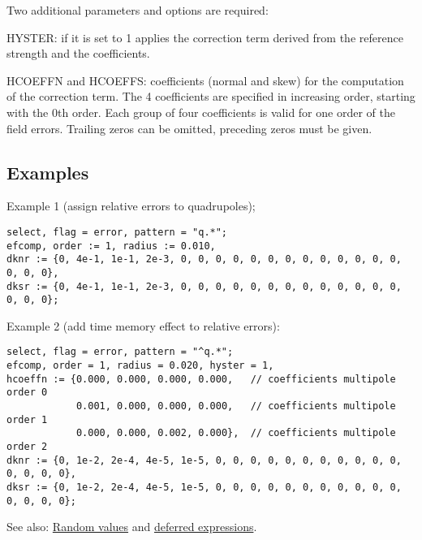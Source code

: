 Two additional parameters and options are required: 

HYSTER: if it is set to 1 applies the correction term derived from the
reference strength and the coefficients.  

HCOEFFN and HCOEFFS: coefficients (normal and skew) for the computation
of the correction term. The 4 coefficients are specified in increasing
order, starting with the 0th order. Each group of four coefficients is
valid for one order of the field errors. Trailing zeros can be omitted,
preceding zeros must be given.  

\subsection{Examples} 

Example 1 (assign relative errors to quadrupoles); 
\begin{verbatim}
select, flag = error, pattern = "q.*";
efcomp, order := 1, radius := 0.010,
dknr := {0, 4e-1, 1e-1, 2e-3, 0, 0, 0, 0, 0, 0, 0, 0, 0, 0, 0, 0, 0, 0, 0, 0},
dksr := {0, 4e-1, 1e-1, 2e-3, 0, 0, 0, 0, 0, 0, 0, 0, 0, 0, 0, 0, 0, 0, 0, 0};
\end{verbatim}

Example 2 (add time memory effect to relative errors): 
\begin{verbatim}
select, flag = error, pattern = "^q.*";
efcomp, order = 1, radius = 0.020, hyster = 1,
hcoeffn := {0.000, 0.000, 0.000, 0.000,   // coefficients multipole order 0
            0.001, 0.000, 0.000, 0.000,   // coefficients multipole order 1
            0.000, 0.000, 0.002, 0.000},  // coefficients multipole order 2
dknr := {0, 1e-2, 2e-4, 4e-5, 1e-5, 0, 0, 0, 0, 0, 0, 0, 0, 0, 0, 0, 0, 0, 0, 0},
dksr := {0, 1e-2, 2e-4, 4e-5, 1e-5, 0, 0, 0, 0, 0, 0, 0, 0, 0, 0, 0, 0, 0, 0, 0};
\end{verbatim}

See also: \href{../Introduction/expression.html#random}{Random values}
and \href{../Introduction/expression.html#defer}{deferred expressions}.  


